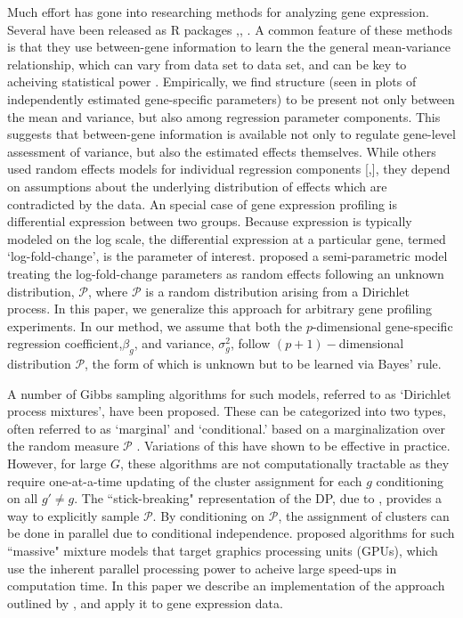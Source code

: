 Much effort has gone into researching methods for analyzing gene expression. Several have been released as R packages \citep{edger2010},\citep{deseq2014}, \citep{voom}. A common feature of these methods is that they use between-gene information to learn the the general mean-variance relationship, which can vary from data set to data set, and can be key to acheiving statistical power \cite{voom}. Empirically, we find structure (seen in plots of independently estimated gene-specific parameters) to be present not only between the mean and variance, but also among regression parameter components. This suggests that between-gene information is available not only to regulate gene-level assessment of variance, but also the estimated effects themselves. While others used random effects models for individual regression components [\citep{deseq2014},\citep{landau}], they depend on assumptions about the underlying distribution of effects which are contradicted by the data. An special case of gene expression profiling is differential expression between two groups. Because expression is typically modeled on the log scale, the differential expression at a particular gene, termed `log-fold-change', is the parameter of interest. \citet{liu} proposed a semi-parametric model treating the log-fold-change parameters as random effects following an unknown distribution, $\mathcal{P}$, where $\mathcal{P}$ is a random distribution arising from a Dirichlet process. In this paper, we generalize this approach for arbitrary gene profiling experiments. In our method, we assume that both the $p$-dimensional gene-specific regression coefficient,$\beta_g$, and variance, $\sigma^2_g$, follow $(p+1)-$dimensional distribution $\mathcal{P}$, the form of which is unknown but to be learned via Bayes' rule.

A number of Gibbs sampling algorithms for such models, referred to as `Dirichlet process mixtures', have been proposed. These can be categorized into two types, often referred to as `marginal' and `conditional.' based on a marginalization over the random measure $\mathcal{P}$ \citep{neal2000}. Variations of this have shown to be effective in practice. However, for large $G$, these algorithms are not computationally tractable as they require one-at-a-time updating of the cluster assignment for each $g$ conditioning on all $g'\neq g$. The ``stick-breaking" representation of the DP, due to \citet{sethuraman}, provides a way to explicitly sample $\mathcal{P}$. By conditioning on $\mathcal{P}$, the assignment of clusters can be done in parallel due to conditional independence. \citet{suchard} proposed algorithms for such ``massive" mixture models that target graphics processing units (GPUs), which use the inherent parallel processing power to acheive large speed-ups in computation time. In this paper we describe an implementation of the approach outlined by \citet{suchard}, and apply it to gene expression data.

